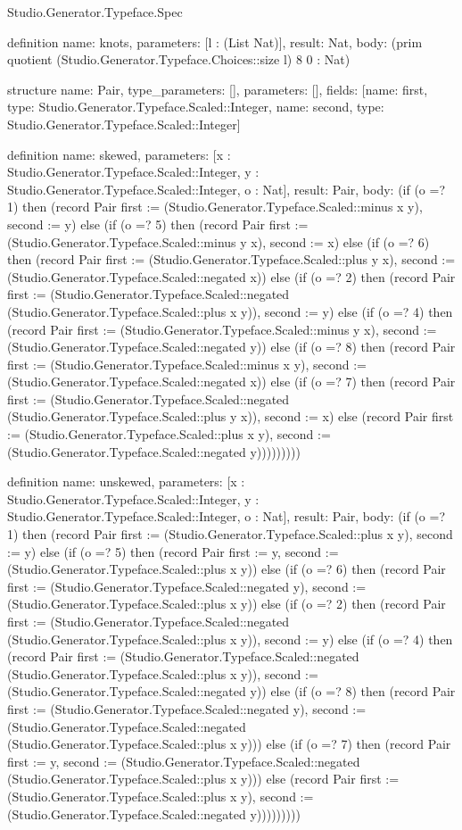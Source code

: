 \begin{lexlean}{Studio.Generator.Typeface.Spec}
\begin{semanticmodule}
definition{
  name: knots,
  parameters: [l : (List Nat)],
  result: Nat,
  body: (prim quotient (Studio.Generator.Typeface.Choices::size l) 8 0 : Nat)
}

structure{
  name: Pair,
  type_parameters: [],
  parameters: [],
  fields: [{name: first, type: Studio.Generator.Typeface.Scaled::Integer}, {name: second, type: Studio.Generator.Typeface.Scaled::Integer}]
}

definition{
  name: skewed,
  parameters: [x : Studio.Generator.Typeface.Scaled::Integer, y : Studio.Generator.Typeface.Scaled::Integer, o : Nat],
  result: Pair,
  body: (if (o =? 1) then (record Pair {first := (Studio.Generator.Typeface.Scaled::minus x y), second := y}) else (if (o =? 5) then (record Pair {first := (Studio.Generator.Typeface.Scaled::minus y x), second := x}) else (if (o =? 6) then (record Pair {first := (Studio.Generator.Typeface.Scaled::plus y x), second := (Studio.Generator.Typeface.Scaled::negated x)}) else (if (o =? 2) then (record Pair {first := (Studio.Generator.Typeface.Scaled::negated (Studio.Generator.Typeface.Scaled::plus x y)), second := y}) else (if (o =? 4) then (record Pair {first := (Studio.Generator.Typeface.Scaled::minus y x), second := (Studio.Generator.Typeface.Scaled::negated y)}) else (if (o =? 8) then (record Pair {first := (Studio.Generator.Typeface.Scaled::minus x y), second := (Studio.Generator.Typeface.Scaled::negated x)}) else (if (o =? 7) then (record Pair {first := (Studio.Generator.Typeface.Scaled::negated (Studio.Generator.Typeface.Scaled::plus y x)), second := x}) else (record Pair {first := (Studio.Generator.Typeface.Scaled::plus x y), second := (Studio.Generator.Typeface.Scaled::negated y)}))))))))
}

definition{
  name: unskewed,
  parameters: [x : Studio.Generator.Typeface.Scaled::Integer, y : Studio.Generator.Typeface.Scaled::Integer, o : Nat],
  result: Pair,
  body: (if (o =? 1) then (record Pair {first := (Studio.Generator.Typeface.Scaled::plus x y), second := y}) else (if (o =? 5) then (record Pair {first := y, second := (Studio.Generator.Typeface.Scaled::plus x y)}) else (if (o =? 6) then (record Pair {first := (Studio.Generator.Typeface.Scaled::negated y), second := (Studio.Generator.Typeface.Scaled::plus x y)}) else (if (o =? 2) then (record Pair {first := (Studio.Generator.Typeface.Scaled::negated (Studio.Generator.Typeface.Scaled::plus x y)), second := y}) else (if (o =? 4) then (record Pair {first := (Studio.Generator.Typeface.Scaled::negated (Studio.Generator.Typeface.Scaled::plus x y)), second := (Studio.Generator.Typeface.Scaled::negated y)}) else (if (o =? 8) then (record Pair {first := (Studio.Generator.Typeface.Scaled::negated y), second := (Studio.Generator.Typeface.Scaled::negated (Studio.Generator.Typeface.Scaled::plus x y))}) else (if (o =? 7) then (record Pair {first := y, second := (Studio.Generator.Typeface.Scaled::negated (Studio.Generator.Typeface.Scaled::plus x y))}) else (record Pair {first := (Studio.Generator.Typeface.Scaled::plus x y), second := (Studio.Generator.Typeface.Scaled::negated y)}))))))))
}


\end{semanticmodule}
\end{lexlean}
